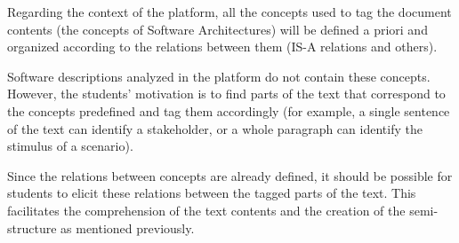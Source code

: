 Regarding the context of the platform, all the concepts used to tag the document contents (the concepts of Software Architectures) will be defined a priori and organized according to the relations between them (IS-A relations and others).

Software descriptions analyzed in the platform do not contain these concepts. However, the students' motivation is to find parts of the text that correspond to the concepts predefined and tag them accordingly (for example, a single sentence of the text can identify a stakeholder, or a whole paragraph can identify the stimulus of a scenario). 

Since the relations between concepts are already defined, it should be possible for students to elicit these relations between the tagged parts of the text. This facilitates the comprehension of the text contents and the creation of the semi-structure as mentioned previously.
